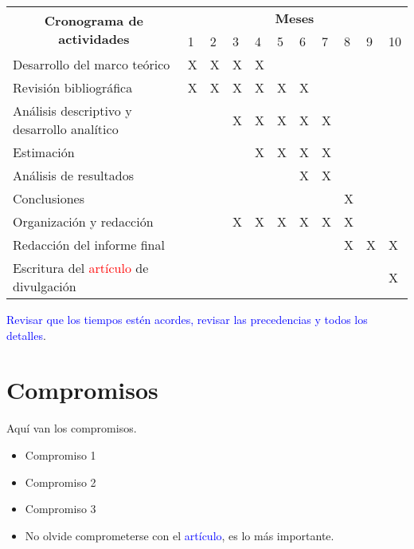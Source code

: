 \documentclass[12pt]{article}
\begin{document}
	\begin{center}
		\begin{tabular}{lllllllllll}
			\hline
			\multicolumn{1}{c}{\multirow{2}{*}{\textbf{Cronograma de actividades}}} & \multicolumn{10}{c}{\textbf{Meses}}  \\  
			\multicolumn{1}{c}{} & 1 & 2 & 3 & 4 & 5 & 6 & 7 & 8 & 9 & 10 \\ \hline
			Desarrollo del marco teórico & X & X & X & X & & & & & &  \\ 
			Revisión bibliográfica & X & X & X & X & X & X & & & &  \\ 
			Análisis descriptivo y desarrollo analítico & & & X & X & X & X & X & & &\\ 
			Estimación & & & & X & X & X & X & & &  \\ 
			Análisis de resultados & & & & & & X & X & & &  \\ 	
			Conclusiones & & & & & & & & X & &  \\ 
			Organización y redacción & & & X & X & X & X & X & X & &  \\ 
			Redacción del informe final & & & & & & & & X & X & X \\
			Escritura del \textcolor{red}{artículo} de divulgación & & & & & & & & & & X \\\hline
			
		\end{tabular}
	\end{center}

\textcolor{blue}{Revisar que los tiempos estén acordes, revisar las precedencias y todos los detalles}.

\section{Compromisos}
Aquí van los compromisos.

\begin{itemize}
	\item Compromiso 1
	\item Compromiso 2
	\item Compromiso 3
	\item No olvide comprometerse con el \textcolor{blue}{artículo}, es lo más importante.
\end{itemize}

\newpage

 
\end{document}
